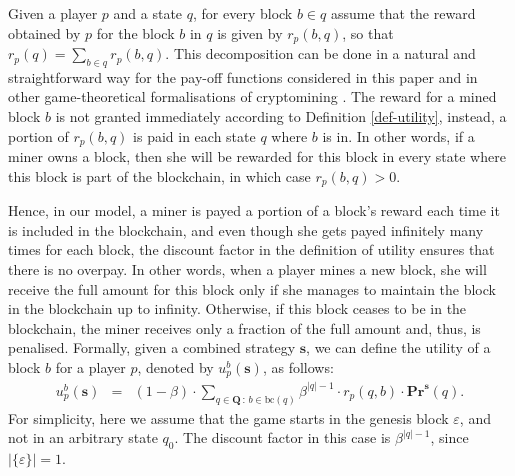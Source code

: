 \documentclass[a4paper,english,cleveref, autoref,numberwithinsect]{lipics-v2019}
\newcommand{\pr}{\mathbf{Pr}}
\newcommand{\bs}{\mathbf{s}}
\newcommand{\bchain}{\text{bc}}
\newcommand{\bQ}{\mathbf{Q}}
\begin{document}
Given a player $p$ and a state $q$, for every block $b \in q$ assume that the reward obtained by $p$ for the block $b$ in $q$ is given by $r_p(b,q)$, so that $r_p(q) = \sum_{b \in q} r_p(b,q)$. This decomposition can be done in a natural and straightforward way for the pay-off functions considered in this paper and in other game-theoretical formalisations of cryptomining \cite{mininggames:2016,koutsoupias2018blockchain}. 
The reward for a mined block $b$ 
is not granted immediately according to  Definition \ref{def-utility}, instead,
a portion of $r_p(b,q)$ is paid in each state $q$ where $b$ is in.
In other words, if a miner owns a block, then she will be rewarded for this block in every state where this block is part of the blockchain, in which case $r_p(b,q) > 0$. 

Hence, in our model, a miner is payed a portion of a block's reward each time it is included in the blockchain, and even though  she gets payed infinitely many times for each block, the 
discount factor in the definition of utility ensures that there is no overpay.
In other words, 
when a player mines a new block, she will receive the full amount for this block only if she manages to maintain the block in the blockchain up to infinity. Otherwise, if this block 
ceases to be in the blockchain, the miner receives only a fraction of the full amount and, thus, is penalised. Formally, given a combined strategy $\bs$, we can define the utility of a block $b$ for a player $p$, denoted by $u_p^b(\bs)$,  as follows:
\begin{eqnarray*}
u_p^b(\bs) & =  & (1 - \beta) \cdot  \sum_{q \in \bQ \,:\, b \in \bchain(q)} \beta^{|q|-1} \cdot  r_p(q,b) \cdot \pr^{\bs}(q).
\end{eqnarray*}
For simplicity, here we assume that the game starts in the genesis block $\varepsilon$, and not in an arbitrary state $q_0$. The discount factor in this case is $\beta^{|q|-1}$, since $|\{\varepsilon\}|= 1$.  
\end{document}
